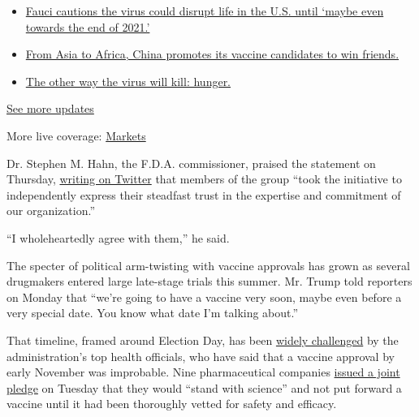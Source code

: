\begin{itemize}
\tightlist
\item
  \href{https://www.nytimes3xbfgragh.onion/2020/09/11/world/covid-19-coronavirus.html?action=click\&pgtype=Article\&state=default\&region=MAIN_CONTENT_1\&context=storylines_live_updates\#link-dfb8a16}{Fauci
  cautions the virus could disrupt life in the U.S. until `maybe even
  towards the end of 2021.'}
\item
  \href{https://www.nytimes3xbfgragh.onion/2020/09/11/world/covid-19-coronavirus.html?action=click\&pgtype=Article\&state=default\&region=MAIN_CONTENT_1\&context=storylines_live_updates\#link-7104d154}{From
  Asia to Africa, China promotes its vaccine candidates to win friends.}
\item
  \href{https://www.nytimes3xbfgragh.onion/2020/09/11/world/covid-19-coronavirus.html?action=click\&pgtype=Article\&state=default\&region=MAIN_CONTENT_1\&context=storylines_live_updates\#link-393ad215}{The
  other way the virus will kill: hunger.}
\end{itemize}

\href{https://www.nytimes3xbfgragh.onion/2020/09/11/world/covid-19-coronavirus.html?action=click\&pgtype=Article\&state=default\&region=MAIN_CONTENT_1\&context=storylines_live_updates}{See
more updates}

More live coverage:
\href{https://www.nytimes3xbfgragh.onion/live/2020/09/11/business/stock-market-today-coronavirus?action=click\&pgtype=Article\&state=default\&region=MAIN_CONTENT_1\&context=storylines_live_updates}{Markets}

Dr. Stephen M. Hahn, the F.D.A. commissioner, praised the statement on
Thursday,
\href{https://twitter.com/SteveFDA/status/1304053712940339201}{writing
on Twitter} that members of the group ``took the initiative to
independently express their steadfast trust in the expertise and
commitment of our organization.''

``I wholeheartedly agree with them,'' he said.

The specter of political arm-twisting with vaccine approvals has grown
as several drugmakers entered large late-stage trials this summer. Mr.
Trump told reporters on Monday that ``we're going to have a vaccine very
soon, maybe even before a very special date. You know what date I'm
talking about.''

That timeline, framed around Election Day, has been
\href{https://www.nytimes3xbfgragh.onion/2020/09/04/science/covid-vaccine-pharma-pledge.html}{widely
challenged} by the administration's top health officials, who have said
that a vaccine approval by early November was improbable. Nine
pharmaceutical companies
\href{https://www.nytimes3xbfgragh.onion/2020/09/08/health/9-drug-companies-pledge-coronavirus-vaccine.html}{issued
a joint pledge} on Tuesday that they would ``stand with science'' and
not put forward a vaccine until it had been thoroughly vetted for safety
and efficacy.

